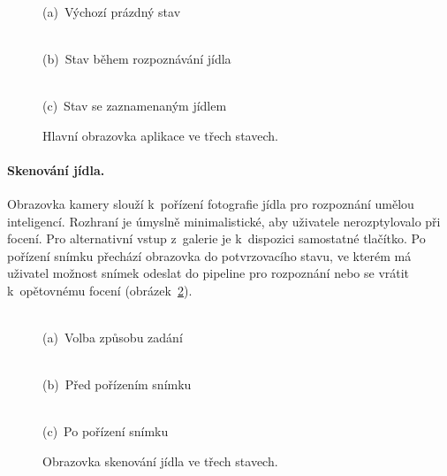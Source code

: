 \begin{figure}[!htb]
	\centering
	\begin{minipage}[t]{0.31\textwidth}
		\centering
		\\(a)~Výchozí prázdný stav
	\end{minipage}\hfill
	\begin{minipage}[t]{0.31\textwidth}
		\centering
		\\(b)~Stav během rozpoznávání jídla
	\end{minipage}\hfill
	\begin{minipage}[t]{0.31\textwidth}
		\centering
		\\(c)~Stav se zaznamenaným jídlem
	\end{minipage}
	\caption{Hlavní obrazovka aplikace ve třech stavech.}
	\label{fig:screenDashboard}
\end{figure}

\paragraph{Skenování jídla.}
Obrazovka kamery slouží k~pořízení fotografie jídla pro rozpoznání umělou inteligencí.
Rozhraní je úmyslně minimalistické, aby uživatele nerozptylovalo při focení.
Pro alternativní vstup z~galerie je k~dispozici samostatné tlačítko.
Po pořízení snímku přechází obrazovka do potvrzovacího stavu, ve kterém má uživatel možnost snímek odeslat do pipeline pro rozpoznání nebo se vrátit k~opětovnému focení (obrázek~\ref{fig:screenScanCamera}).

\begin{figure}[!htb]
	\centering
	\begin{minipage}[t]{0.31\textwidth}
		\centering
		\\(a)~Volba způsobu zadání
	\end{minipage}\hfill
	\begin{minipage}[t]{0.31\textwidth}
		\centering
		\\(b)~Před pořízením snímku
	\end{minipage}\hfill
	\begin{minipage}[t]{0.31\textwidth}
		\centering
		\\(c)~Po pořízení snímku
	\end{minipage}
	\caption{Obrazovka skenování jídla ve třech stavech.}
	\label{fig:screenScanCamera}
\end{figure}

